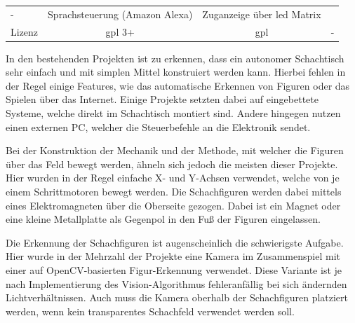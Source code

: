 \begin{longtable}[]{@{}lccr@{}}
\begin{minipage}[t]{0.25\columnwidth}
-\strut
\end{minipage} & \begin{minipage}[t]{0.26\columnwidth}\centering
Sprachsteuerung (Amazon Alexa)\strut
\end{minipage} & \begin{minipage}[t]{0.19\columnwidth}\raggedleft
Zuganzeige über \gls{led} Matrix\strut
\end{minipage}\tabularnewline
\begin{minipage}[t]{0.19\columnwidth}\raggedright
Lizenz\strut
\end{minipage} & \begin{minipage}[t]{0.25\columnwidth}\centering
\gls{gpl} 3+\strut
\end{minipage} & \begin{minipage}[t]{0.26\columnwidth}\centering
\gls{gpl}\strut
\end{minipage} & \begin{minipage}[t]{0.19\columnwidth}\raggedleft
-\strut
\end{minipage}\tabularnewline
\bottomrule
\end{longtable}

In den bestehenden Projekten ist zu erkennen, dass ein autonomer
Schachtisch sehr einfach und mit simplen Mittel konstruiert werden kann.
Hierbei fehlen in der Regel einige Features, wie das automatische
Erkennen von Figuren oder das Spielen über das Internet. Einige Projekte
setzten dabei auf eingebettete Systeme, welche direkt im Schachtisch
montiert sind. Andere hingegen nutzen einen externen PC, welcher die
Steuerbefehle an die Elektronik sendet.

Bei der Konstruktion der Mechanik und der Methode, mit welcher die
Figuren über das Feld bewegt werden, ähneln sich jedoch die meisten
dieser Projekte. Hier wurden in der Regel einfache X- und Y-Achsen
verwendet, welche von je einem Schrittmotoren bewegt werden. Die
Schachfiguren werden dabei mittels eines Elektromagneten über die
Oberseite gezogen. Dabei ist ein Magnet oder eine kleine Metallplatte
als Gegenpol in den Fuß der Figuren eingelassen.

Die Erkennung der Schachfiguren ist augenscheinlich die schwierigste
Aufgabe. Hier wurde in der Mehrzahl der Projekte eine Kamera im
Zusammenspiel mit einer auf OpenCV-basierten Figur-Erkennung verwendet.
Diese Variante ist je nach Implementierung des Vision-Algorithmus
fehleranfällig bei sich ändernden Lichtverhältnissen. Auch muss die
Kamera oberhalb der Schachfiguren platziert werden, wenn kein
transparentes Schachfeld verwendet werden soll.

